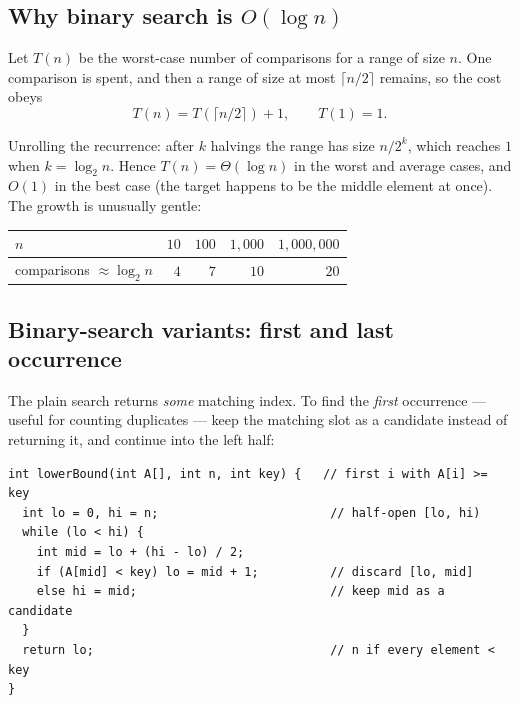 \documentclass[11pt]{article}
\begin{document}
\subsection{Why binary search is $O(\log n)$}

Let $T(n)$ be the worst-case number of comparisons for a range of size $n$. One comparison is spent, and then a range of size at most $\lceil n/2 \rceil$ remains, so the cost obeys
\[ T(n) = T(\lceil n/2 \rceil) + 1, \qquad T(1) = 1. \]

Unrolling the recurrence: after $k$ halvings the range has size $n/2^{k}$, which reaches $1$ when $k = \log_2 n$. Hence $T(n) = \Theta(\log n)$ in the worst and average cases, and $O(1)$ in the best case (the target happens to be the middle element at once). The growth is unusually gentle:

\begin{center}
{\footnotesize
\begin{tabular}{lrrrr}
  \toprule
  $n$ & $10$ & $100$ & $1{,}000$ & $1{,}000{,}000$ \\
  \midrule
  comparisons $\approx \log_2 n$ & $4$ & $7$ & $10$ & $20$ \\
  \bottomrule
\end{tabular}}
\end{center}


\subsection{Binary-search variants: first and last occurrence}

The plain search returns \emph{some} matching index. To find the \emph{first} occurrence --- useful for counting duplicates --- keep the matching slot as a candidate instead of returning it, and continue into the left half:

{\footnotesize
\begin{verbatim}
int lowerBound(int A[], int n, int key) {   // first i with A[i] >= key
  int lo = 0, hi = n;                        // half-open [lo, hi)
  while (lo < hi) {
    int mid = lo + (hi - lo) / 2;
    if (A[mid] < key) lo = mid + 1;          // discard [lo, mid]
    else hi = mid;                           // keep mid as a candidate
  }
  return lo;                                 // n if every element < key
}
\end{verbatim}
}
\end{document}
